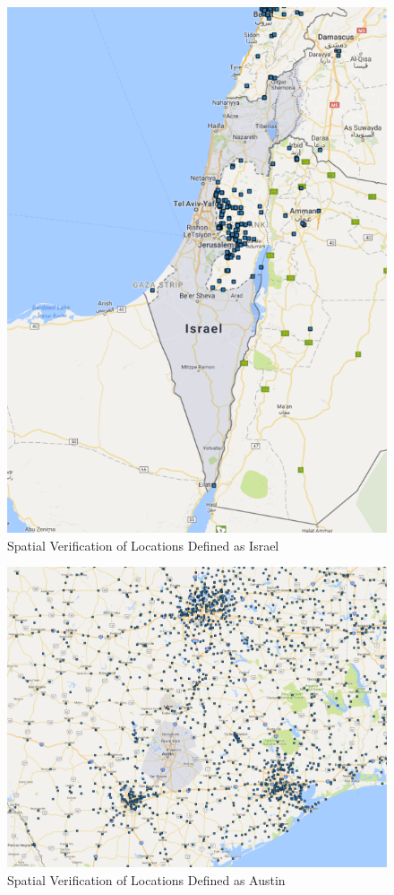 \documentclass[12pt]{article}
\begin{document}
\begin{figure}[h]
\begin{centering}
  \includegraphics[width=\textwidth]{IsraelPrime}
  \caption{Spatial Verification of Locations Defined as Israel}
   \label{fig:IsraelPrime}
\end{centering}
\end{figure}

\begin{figure}[h]
\begin{centering}
  \includegraphics[width=\textwidth]{AustinPrime}
  \caption{Spatial Verification of Locations Defined as Austin}
   \label{fig:AustinPrime}
\end{centering}
\end{figure}
\end{document}

